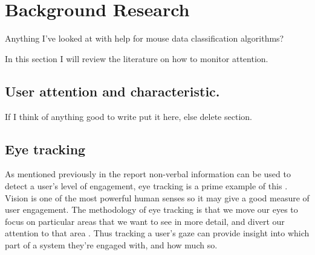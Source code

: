 \documentclass{article}
\begin{document}


\section{Background Research}
Anything I've looked at with help for mouse data classification algorithms? 

In this section I will review the literature on how to monitor attention.

\subsection{User attention and characteristic.}

If I think of anything good to write put it here, else delete section.

\subsection{Eye tracking}

As mentioned previously in the report non-verbal information can be used to detect a
user’s level of engagement, eye tracking is a prime example of this \cite{lala2017detection}.
Vision is one of the most powerful human senses so it may give a good measure of user engagement. 
The methodology of eye tracking is that we move our eyes to focus on particular areas that we want to see in more detail, and divert our attention to that area \cite{duchowski2007eye}. 
Thus tracking a user’s gaze can provide insight into which part of a system they’re engaged with, and how much so.
\end{document}
